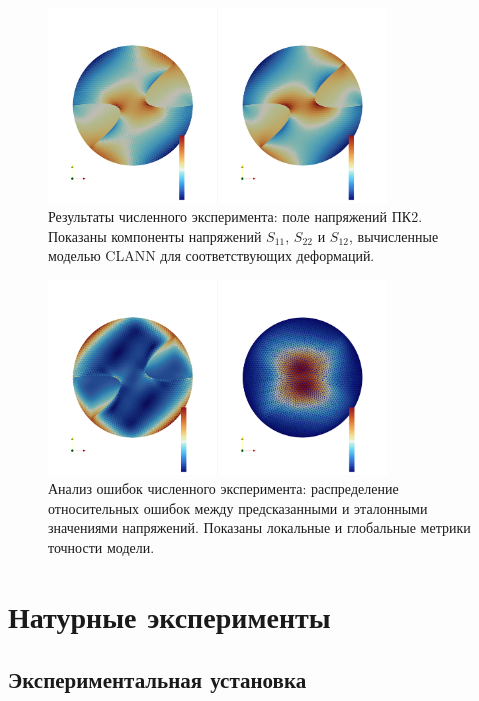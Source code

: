 \begin{figure}[htbp]
\centering
\includegraphics[width=0.8\textwidth]{img/bx_inf_S.png}
\caption{Результаты численного эксперимента: поле напряжений ПК2. Показаны компоненты напряжений $S_{11}$, $S_{22}$ и $S_{12}$, вычисленные моделью CLANN для соответствующих деформаций.}
\label{fig:numerical_stresses}
\end{figure}

\begin{figure}[htbp]
\centering
\includegraphics[width=0.8\textwidth]{img/bx_inf_err.png}
\caption{Анализ ошибок численного эксперимента: распределение относительных ошибок между предсказанными и эталонными значениями напряжений. Показаны локальные и глобальные метрики точности модели.}
\label{fig:numerical_errors}
\end{figure}


\section{Натурные эксперименты}
\subsection{Экспериментальная установка}

